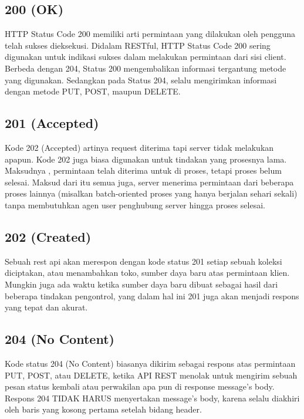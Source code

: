 \documentclass[12pt,a4paper]{article}
\begin{document}
\subsection{200 (OK)}
HTTP Status Code 200 memiliki arti permintaan yang dilakukan oleh pengguna telah sukses dieksekusi. Didalam RESTful, HTTP Status Code 200 sering digunakan untuk indikasi sukses dalam melakukan permintaan dari sisi client. Berbeda dengan 204, Status 200 mengembalikan informasi tergantung metode yang digunakan.
Sedangkan pada Status 204, selalu mengirimkan informasi dengan metode PUT, POST, maupun DELETE.
\subsection{201 (Accepted)}
Kode 202 (Accepted) artinya request diterima tapi server tidak melakukan apapun. Kode 202 juga biasa digunakan untuk tindakan yang prosesnya lama. Maksudnya , permintaan telah diterima untuk di proses, tetapi proses belum selesai. 
Maksud dari itu semua juga, server menerima permintaan dari beberapa proses lainnya (misalkan batch-oriented proses yang hanya berjalan sehari sekali) tanpa membutuhkan agen user penghubung server hingga proses selesai.
\subsection{202 (Created)}
Sebuah rest api akan merespon dengan kode status 201 setiap sebuah koleksi diciptakan, atau menambahkan toko, sumber daya baru atas permintaan klien. Mungkin juga ada waktu ketika sumber daya baru dibuat sebagai hasil dari beberapa tindakan pengontrol, yang dalam hal ini 201 juga akan menjadi respons yang tepat dan akurat.
\subsection{204 (No Content)}
Kode status 204 (No Content) biasanya dikirim sebagai respons atas permintaan PUT, POST, atau DELETE, ketika API REST menolak untuk mengirim sebuah pesan status kembali atau perwakilan apa pun di response message’s body.\\
 Respons 204 TIDAK HARUS menyertakan message’s body, karena selalu diakhiri oleh baris yang kosong pertama setelah bidang header.
\end{document}
